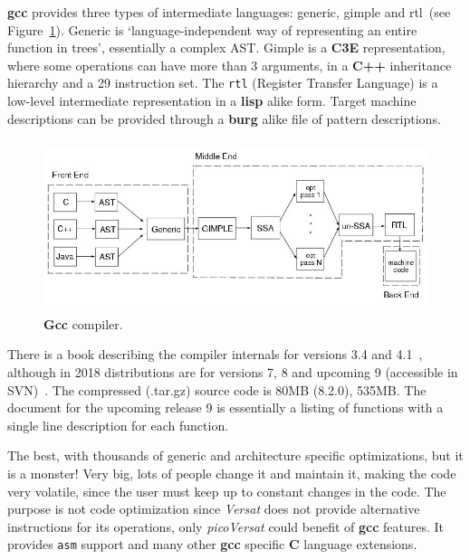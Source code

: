 {\bf gcc} provides three types of intermediate languages: generic, gimple and
rtl~(see Figure~\ref{fig:Gcc}).  Generic is `language-independent way of
representing an entire function in trees', essentially a complex {\sc AST}.
Gimple is a {\bf C3E} representation, where some operations can have more than 3
arguments, in a {\bf C++} inheritance hierarchy and a 29 instruction set.  The
{\tt rtl} (Register Transfer Language) is a low-level intermediate
representation in a {\bf lisp} alike form.  Target machine descriptions can be
provided through a {\bf burg} alike file of pattern descriptions.

\begin{figure}[!htbp]
    \centerline{\includegraphics[height=50mm]{Figures/Gcc.jpg}}
    \vspace{0cm}\caption{{\bf Gcc} compiler.}
    \label{fig:Gcc}
\end{figure}


There is a book describing the compiler internals for versions 3.4 and
4.1~\cite{Stallman:2009}, although in 2018 distributions are for
versions 7, 8 and upcoming 9 (accessible in {\sc SVN})~\cite{Stallman:2018}.
The compressed ({.tar.gz}) source code is 80MB (8.2.0), 535MB.  The document for
the upcoming release 9 is essentially a listing of functions with a single line
description for each function.


The best, with thousands of generic and architecture specific optimizations,
but it is a monster!  Very big, lots of people change it and maintain
it, making the code very volatile, since the user must keep up to constant
changes in the code.  The purpose is not code optimization since {\it Versat} does
not provide alternative instructions for its operations, only {\it picoVersat}
could benefit of {\bf gcc} features.  It provides {\tt asm} support and many other
{\bf gcc} specific {\bf C} language extensions.


